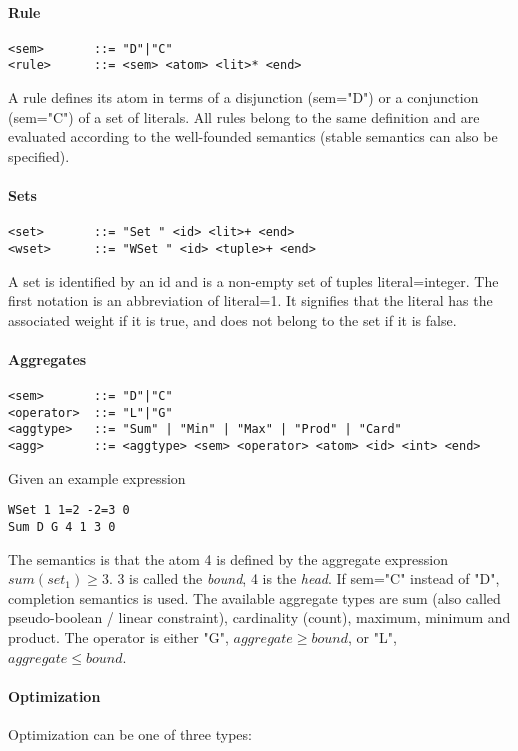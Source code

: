 \documentclass{article}
\begin{document}
\paragraph{Rule}
\begin{verbatim}
<sem>       ::= "D"|"C"
<rule>      ::= <sem> <atom> <lit>* <end>
\end{verbatim} 
A rule defines its atom in terms of a disjunction (sem="D") or a conjunction (sem="C") of a set of literals. All rules belong to the same definition and are evaluated according to the well-founded semantics (stable semantics can also be specified).

\paragraph{Sets}
\begin{verbatim}
<set>       ::= "Set " <id> <lit>+ <end>
<wset>      ::= "WSet " <id> <tuple>+ <end>
\end{verbatim} 
A set is identified by an id and is a non-empty set of tuples literal=integer. The first notation is an abbreviation of literal=1. It signifies that the literal has the associated weight if it is true, and does not belong to the set if it is false.

\paragraph{Aggregates}
\begin{verbatim}
<sem>       ::= "D"|"C"
<operator>  ::= "L"|"G"
<aggtype>   ::= "Sum" | "Min" | "Max" | "Prod" | "Card"
<agg>       ::= <aggtype> <sem> <operator> <atom> <id> <int> <end>
\end{verbatim} 
Given an example expression
\begin{verbatim}
WSet 1 1=2 -2=3 0
Sum D G 4 1 3 0
\end{verbatim}
The semantics is that the atom 4 is defined by the aggregate expression $sum(set_1) \geq 3$. 3 is called the \emph{bound}, 4 is the \emph{head}. If sem="C" instead of "D", completion semantics is used.
The available aggregate types are sum (also called pseudo-boolean / linear constraint), cardinality (count), maximum, minimum and product. The operator is either "G", $aggregate \geq bound$, or "L", $aggregate \leq bound$.
 
\paragraph{Optimization}
Optimization can be one of three types:
\end{document}
